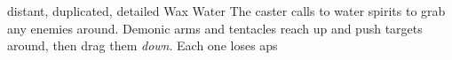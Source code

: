   {distant, duplicated, detailed}%
  {Wax}%
  {Water}%
  {}%
  {The caster calls to water spirits to grab any enemies around.
    Demonic arms and tentacles reach up and push targets around, then drag them \emph{down}.
    Each one loses  \glspl{ap}}%
  {}
